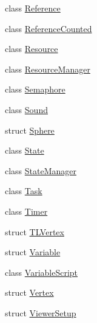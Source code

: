 \begin{DoxyCompactItemize}
\item 
class \hyperlink{classmage_1_1_reference}{Reference}
\item 
class \hyperlink{classmage_1_1_reference_counted}{Reference\+Counted}
\item 
class \hyperlink{classmage_1_1_resource}{Resource}
\item 
class \hyperlink{classmage_1_1_resource_manager}{Resource\+Manager}
\item 
class \hyperlink{classmage_1_1_semaphore}{Semaphore}
\item 
class \hyperlink{classmage_1_1_sound}{Sound}
\item 
struct \hyperlink{structmage_1_1_sphere}{Sphere}
\item 
class \hyperlink{classmage_1_1_state}{State}
\item 
class \hyperlink{classmage_1_1_state_manager}{State\+Manager}
\item 
class \hyperlink{classmage_1_1_task}{Task}
\item 
class \hyperlink{classmage_1_1_timer}{Timer}
\item 
struct \hyperlink{structmage_1_1_t_l_vertex}{T\+L\+Vertex}
\item 
struct \hyperlink{structmage_1_1_variable}{Variable}
\item 
class \hyperlink{classmage_1_1_variable_script}{Variable\+Script}
\item 
struct \hyperlink{structmage_1_1_vertex}{Vertex}
\item 
struct \hyperlink{structmage_1_1_viewer_setup}{Viewer\+Setup}
\end{DoxyCompactItemize}

